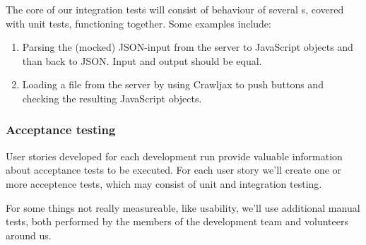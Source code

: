The core of our integration tests will consist of behaviour of several s, covered with unit tests, functioning together. Some examples include:
\begin{enumerate}
	\item Parsing the (mocked) JSON-input from the server to JavaScript objects and than back to JSON. Input and output should be equal.
	\item Loading a file from the server by using Crawljax to push buttons and checking the resulting JavaScript objects.
\end{enumerate}

\subsubsection{Acceptance testing}
User stories developed for each development run provide valuable information about acceptance tests to be executed. For each user story we'll create one or more acceptence tests, which may consist of unit and integration testing.

For some things not really measureable, like usability, we'll use additional manual tests, both performed by the members of the development team and volunteers around us.
